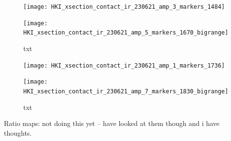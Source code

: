 \begin{figure}[H]
\centering
\begin{minipage}{.45\textwidth}
  \centering
  \texttt{[image: HKI\_xsection\_contact\_ir\_230621\_amp\_3\_markers\_1484]}
\end{minipage}
\begin{minipage}{.45\textwidth}
  \centering
  \texttt{[image: HKI\_xsection\_contact\_ir\_230621\_amp\_5\_markers\_1670\_bigrange]}
\end{minipage}
\caption[txt]{txt}
\label{fig:afm_xsection_irmaps_1484_1670}
\end{figure}

\begin{figure}[H]
\centering
\begin{minipage}{.45\textwidth}
  \centering
  \texttt{[image: HKI\_xsection\_contact\_ir\_230621\_amp\_1\_markers\_1736]}
\end{minipage}
\begin{minipage}{.45\textwidth}
  \centering
  \texttt{[image: HKI\_xsection\_contact\_ir\_230621\_amp\_7\_markers\_1830\_bigrange]}
\end{minipage}
\caption[txt]{txt}
\label{fig:afm_xsection_irmaps_1736_1830}
\end{figure}

Ratio maps: not doing this yet -- have looked at them though and i have thoughts.


